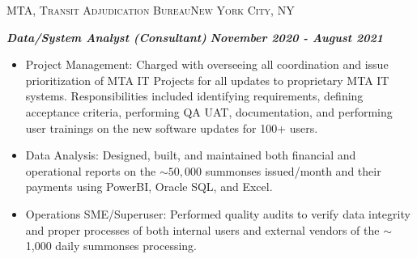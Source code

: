 \documentclass[a4paper]{article}
\newcommand{\jobtitle} [1] {
    {\hspace*{-18pt} \textsc{#1}}
    
}
\begin{document}
\jobtitle{MTA, Transit Adjudication Bureau\hfill New York City, NY}
\hspace*{-16pt}\textit{\textbf{Data/System Analyst (Consultant)}} \hfill \textit{\textbf{November 2020 - August 2021}}\\
\vspace{-1mm}
\begin{itemize}[leftmargin=10pt,align=left] \itemsep 1pt
    \item Project Management: Charged with overseeing all coordination and issue prioritization of MTA IT Projects for all updates to proprietary MTA IT systems.
            Responsibilities included identifying requirements, defining acceptance criteria, performing QA UAT, documentation, and performing user trainings on the new software updates for 100+ users.
	\item Data Analysis: Designed, built, and maintained both financial and operational reports on the $\sim 50,000$ summonses issued/month and their payments using PowerBI, Oracle SQL, and Excel.
    \item Operations SME/Superuser: Performed quality audits to verify data integrity and proper processes of both internal users and external vendors of the $\sim$ 1,000 daily summonses processing.
\end{itemize}
\end{document}
